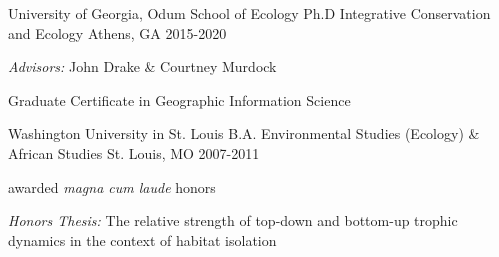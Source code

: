 

\begin{cventries}

  \cventry
  	{University of Georgia, Odum School of Ecology} %
    {Ph.D Integrative Conservation and Ecology} %
    {Athens, GA} %
    {2015-2020} %
	{
      \begin{cvitems} %
      \item{\textit{Advisors:} John Drake \& Courtney Murdock}
      \item{Graduate Certificate in Geographic Information Science}
      \end{cvitems}
    }

   \cventry
    {Washington University in St. Louis} %
    {B.A. Environmental Studies (Ecology) \& African Studies} %
    {St. Louis, MO} %
    {2007-2011} %
    {
      \begin{cvitems} %
      	\item {awarded \textit{magna cum laude} honors}
        \item { \textit{Honors Thesis:} The relative strength of top-down and bottom-up trophic dynamics in the context of habitat isolation}
      \end{cvitems}
    }

\end{cventries}
